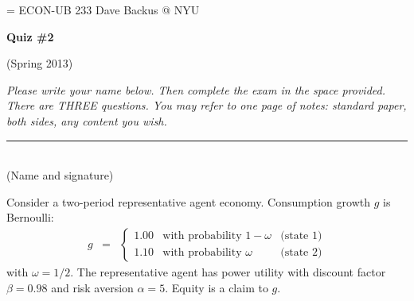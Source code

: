 \documentclass[11pt]{exam}
\begin{document}
\parskip=\bigskipamount
\parindent=0.0in
\thispagestyle{empty}
{\large ECON-UB 233 \hfill Dave Backus @ NYU}

\bigskip\bigskip
\centerline{\Large \bf Quiz \#2}
\centerline{(Spring 2013)}

\bigskip
{\it Please write your name below.
Then complete the exam in the space provided.
There are THREE questions.
You may refer to one page of notes:
standard paper, both sides, any content you wish.}

\bigskip
\begin{flushleft}
\rule{4in}{0.5pt} \\ (Name and signature)
\end{flushleft}

\begin{questions}
Consider a two-period representative agent economy.
Consumption growth $g$ is Bernoulli:
\begin{eqnarray*}
    g &=&
        \left\{
        \begin{array}{lll}
            1.00    &  \mbox{with probability } 1-\omega & \mbox{(state 1)} \\
            1.10    &  \mbox{with probability } \omega   & \mbox{(state 2)}
        \end{array}
        \right.
\end{eqnarray*}
with $\omega = 1/2$.
The representative agent has power utility with discount factor $\beta = 0.98$
and risk aversion $\alpha = 5$.
Equity is a claim to $g$.

\end{questions}
\end{document}
